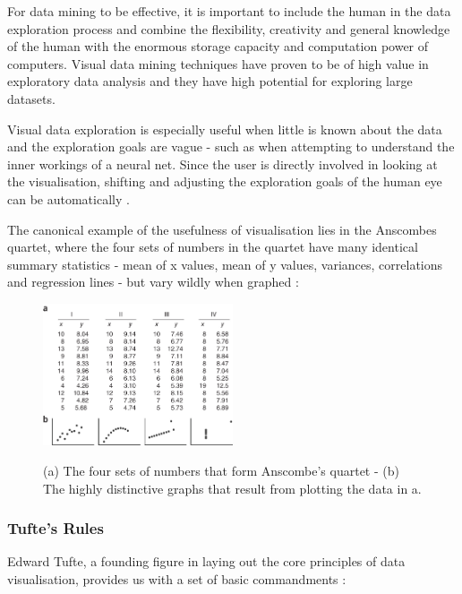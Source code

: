 \documentclass[a4paper,11pt,titlepage]{article}
\begin{document}
		\par 
		For data mining to be effective, it is important to include the human in the data exploration process and combine the flexibility, creativity and general knowledge of the human with the enormous storage capacity and computation power of computers. Visual data mining techniques have proven to be of high value in exploratory data analysis and they have high potential for exploring large datasets.
		\par 
		Visual data exploration is especially useful when little is known about the data and the exploration goals are vague - such as when attempting to understand the inner workings of a neural net. Since the user is directly involved in looking at the visualisation, shifting and adjusting the exploration goals of the human eye can be automatically \cite{Keim2002}.
		\par 
		The canonical example of the usefulness of visualisation lies in the Anscombes quartet, where the four sets of numbers in the quartet have many identical summary statistics - mean of x values, mean of y values, variances, correlations and regression lines - but vary wildly when graphed \cite{Shoresh2011}:

		\begin{figure}[H]
    			\centering	
				{{\includegraphics[width=0.5\textwidth]
    				{img/anscombes_quartet} 
    			}}%
    			\caption{(a) The four sets of numbers that form Anscombe's quartet -  (b) The highly distinctive graphs that result from plotting the data in a.}%
		\end{figure}



\subsubsection{Tufte's Rules}
		\par 
		Edward Tufte, a founding figure in laying out the core principles of data visualisation, provides us with a set of basic commandments \cite{Tufte2001}:		
\end{document}
